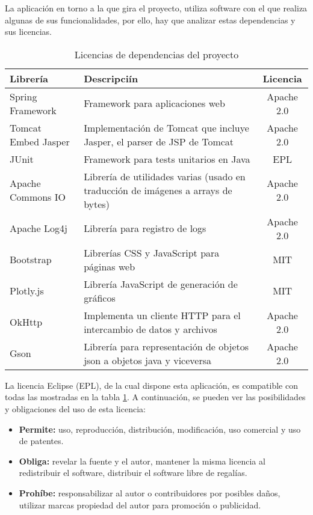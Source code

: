 La aplicación en torno a la que gira el proyecto, utiliza software con el que realiza algunas de sus funcionalidades, por ello, hay que analizar estas dependencias y sus licencias.

\begin{table}[H]
	\centering
	{%
		\begin{tabular}{|p{3cm} | p{5cm} | c |}
			\hline
			\textbf{Librería}   & \textbf{Descripciín} & \textbf{Licencia}\\ \hline
			Spring Framework    & Framework para aplicaciones web & Apache 2.0 \\ \hline
			Tomcat Embed Jasper & Implementación de Tomcat que incluye Jasper, el parser de JSP de Tomcat   & Apache 2.0 \\ \hline
			JUnit               & Framework para tests unitarios en Java & EPL \\ \hline
			Apache Commons IO   & Librería de utilidades varias (usado en  traducción de imágenes a arrays de bytes) & Apache 2.0  \\ \hline
			Apache Log4j        & Librería para registro de logs & Apache 2.0 \\ \hline
			Bootstrap           & Librerías CSS y JavaScript para páginas web & MIT \\ \hline
			Plotly.js           & Librería JavaScript de generación de gráficos & MIT \\ \hline
            OkHttp           & Implementa un cliente HTTP para el intercambio de datos y archivos & Apache 2.0 \\ \hline
            Gson           & Librería para representación de objetos json a  objetos java y viceversa  & Apache 2.0 \\ \hline
		\end{tabular}%
  \caption{Licencias de dependencias del proyecto}
  \label{tabla:licencias}
	}
\end{table}

 La licencia Eclipse (EPL), de la cual dispone esta aplicación, es compatible con todas las mostradas en la tabla \ref{tabla:licencias}. A continuación, se pueden ver las posibilidades y obligaciones del uso de esta licencia:

 \begin{itemize}
     \item \textbf{Permite:} uso, reproducción, distribución, modificación, uso comercial
y uso de patentes.
     \item \textbf{Obliga:} revelar la fuente y el autor, mantener la misma licencia al
redistribuir el software, distribuir el software libre de regalías.
     \item \textbf{Prohíbe:} responsabilizar al autor o contribuidores por posibles
daños, utilizar marcas propiedad del autor para promoción o publicidad.
 \end{itemize}

